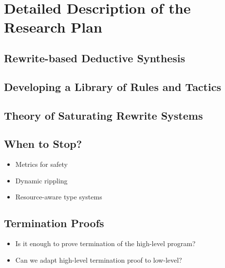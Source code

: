 \section{Detailed Description of the Research Plan}

\subsection{Rewrite-based Deductive Synthesis}

\subsection{Developing a Library of Rules and Tactics}

\subsection{Theory of Saturating Rewrite Systems}

\subsection{When to Stop?}

\begin{itemize}
  \item Metrics for safety
  \item Dynamic rippling
  \item Resource-aware type systems
\end{itemize}

\subsection{Termination Proofs}

\begin{itemize}
  \item Is it enough to prove termination of the high-level program?
  \item Can we adapt high-level termination proof to low-level?
\end{itemize}
